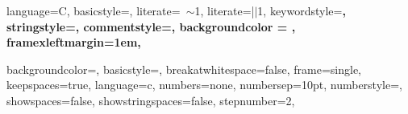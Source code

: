 
\def\AMCIntervalFormat#1#2{[#1,\,#2)}




\makeatletter
\def\lst@Literatekey#1\@nil@{\let\lst@ifxliterate\lst@if
  \expandafter\def\expandafter\lst@literate\expandafter{\lst@literate#1}}
\makeatother
 {%
  language=C,
  basicstyle=\ttfamily\normalsize,
  literate={~}{$\sim$}{1},
  literate={|}{$\mid$}{1},
  keywordstyle=\color{ccsword}\ttfamily\bfseries,
  stringstyle=\color{red}\ttfamily,
  commentstyle=\color{green!50!black}\ttfamily,
  backgroundcolor = \color{gray!10},
  framexleftmargin=1em,
}

 {%
  backgroundcolor=\color{white},
  basicstyle=\ttfamily\footnotesize,
  breakatwhitespace=false,
  frame=single,
  keepspaces=true,
  language=c,
  numbers=none, %
  numbersep=10pt,
  numberstyle=\scriptsize\color{mybg},
  showspaces=false,
  showstringspaces=false,
  stepnumber=2,
}
  
\lstset{style=mingw}




\usepackage{ifoddpage}
\newcommand{\MYcleardoublepage}{\makeatletter%
        \clearpage%
        \ifodd\thepage\else%
          \hbox{}\clearpage%
        \fi%
        \makeatother%
}


